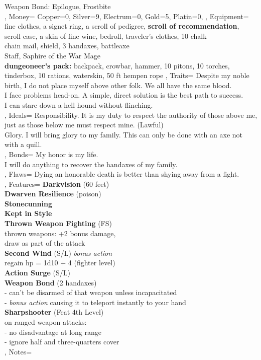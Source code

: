 \documentclass[10pt,a4paper]{scrbook}
\begin{document}
{{{				Weapon Bond: Epilogue, Frostbite\\
			}
		},
		Money={
			Copper=0,
			Silver=9,
			Electrum=0,
			Gold=5,
			Platin=0,
		},
		Equipment={
			fine clothes, a signet ring, a scroll of pedigree, \textbf{scroll of recommendation}, scroll case, a skin of fine wine, bedroll, traveler's clothes, 10 chalk\\
			chain mail, shield, 3 handaxes, battleaxe\\
			Staff, Saphire of the War Mage\\
			\textbf{dungeoneer's pack:} backpack, crowbar, hammer, 10 pitons, 10 torches, tinderbox, 10 rations, waterskin, 50 ft hempen rope
		},
		Traits={
			\tiny
			Despite my noble birth, I do not place myself above other folk. We all have the same blood.\\
			I face problems head-on. A simple, direct solution is the best path to success.\\
			I can stare down a hell hound without flinching.\\
		},
		Ideals={
			\tiny
			Responsibility. It is my duty to respect the authority of those above me, just as those below me must respect mine. (Lawful)\\
			Glory. I will bring glory to my family. This can only be done with an axe not with a quill.\\
		},
		Bonds={
			My honor is my life.\\
			I will do anything to recover the handaxes of my family.\\
		},
		Flaws={
			Dying an honorable death is better than shying away from a fight.\\
		},
		Features={
			\textbf{Darkvision} (60 feet)\\
			\textbf{Dwarven Resilience} (poison)\\
			\textbf{Stonecunning}\\
			\textbf{Kept in Style}\\
			\textbf{Thrown Weapon Fighting} (FS)\\
			thrown weapons: +2 bonus damage,\\
			draw as part of the attack\\
			\textbf{Second Wind} (S/L) \textit{bonus action}\\
			regain hp = 1d10 + 4 (fighter level)\\
			\textbf{Action Surge} (S/L)\\
			\textbf{Weapon Bond} (2 handaxes)\\
			- can't be disarmed of that weapon unless incapacitated\\
			- \textit{bonus action} causing it to teleport instantly to your hand\\
			\textbf{Sharpshooter} (Feat 4th Level)\\
			on ranged weapon attacks:\\
			- no disadvantage at long range\\
			- ignore half and three-quarters cover\\
		},
		Notes={
		}
	}
\end{document}
